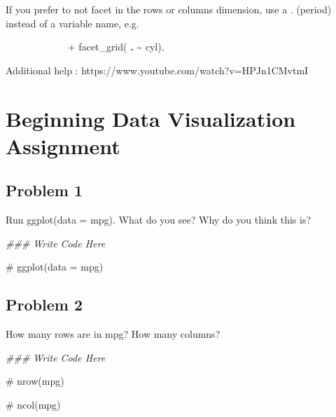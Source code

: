 \documentclass[
  letterpaper,
  DIV=11,
  numbers=noendperiod]{scrreprt}
\newenvironment{Shaded}{\begin{snugshade}}{\end{snugshade}}
\newcommand{\CommentTok}[1]{\textcolor[rgb]{0.37,0.37,0.37}{#1}}
\newcommand{\DocumentationTok}[1]{\textcolor[rgb]{0.37,0.37,0.37}{\textit{#1}}}
\begin{document}
If you prefer to not facet in the rows or columns dimension, use a \(.\)
(period) instead of a variable name, e.g.~

\(\hspace{1in}\) + facet\_grid( \textbf{.} \textasciitilde{} cyl).

Additional help : https://www.youtube.com/watch?v=HPJn1CMvtmI


\chapter*{Beginning Data Visualization
Assignment}\label{beginning-data-visualization-assignment}


\section*{Problem 1}\label{problem-1-1}


Run ggplot(data = mpg). What do you see? Why do you think this is?

\begin{Shaded}
\begin{Highlighting}[]
\DocumentationTok{\#\#\# Write Code Here}

\CommentTok{\# ggplot(data = mpg)}
\end{Highlighting}
\end{Shaded}

\section*{Problem 2}\label{problem-2-1}


How many rows are in mpg? How many columns?

\begin{Shaded}
\begin{Highlighting}[]
\DocumentationTok{\#\#\# Write Code Here}

\CommentTok{\# nrow(mpg)}

\CommentTok{\# ncol(mpg)}
\end{Highlighting}
\end{Shaded}
\end{document}
